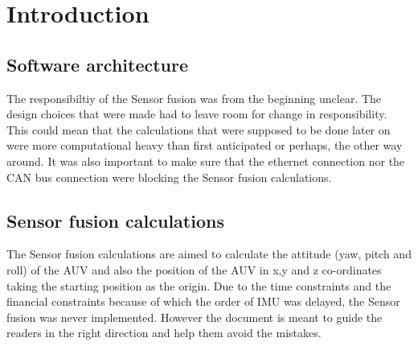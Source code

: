 \section{Introduction}\label{sec:introduction}
\subsection{Software architecture}
The responsibiltiy of the Sensor fusion was from the beginning unclear. The design
choices that were made had to leave room for change in responsibility.
This could mean that the calculations that were supposed to be done later on were
more computational heavy than first anticipated or perhaps, the other way around.
It was also important to make sure that the ethernet connection nor the CAN bus
connection were blocking the Sensor fusion calculations.
 
\subsection{Sensor fusion calculations}
The Sensor fusion calculations are aimed to calculate the attitude (yaw, pitch and roll) of the AUV and also the position of the AUV in x,y and z co-ordinates taking the starting position as the origin. Due to the time constraints and the financial constraints because of which the order of IMU was delayed, the Sensor fusion was never implemented. However the document is meant to guide the readers in the right direction and help them avoid the mistakes.
